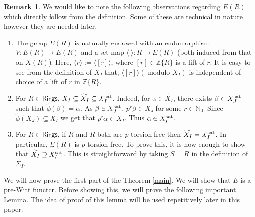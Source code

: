 \documentclass[11pt]{amsart}
\theoremstyle{plain}
\theoremstyle{definition}
\newtheorem{remark}[thm]{Remark}
\renewcommand{\tilde}{\widetilde}
\newcommand{\sat}{{\rm sat}}
\newcommand{\N}{{\mathbb N}}
\newcommand{\Z}{{\mathbb Z}}
\newcommand{\ab}[1]{\langle {#1} \rangle}
\newcommand{\Rings}{{\mathsf{Rings}}}
\begin{document}
\begin{remark}\label{rmk:e} We would like to note the following observations regarding $E(R)$ which directly follow from the definition. Some of these are technical in nature however they are needed later. 
\begin{enumerate}
\item The group $E(R)$ is naturally endowed with an endomorphism $V: E(R) \to E(R)$ and a set map $\ab{ \ }: R \to E(R)$ (both induced from that on $X(R)$). Here, $\ab{r} := \ab{[r]}$, where $[r] \in \Z\{R\}$ is a lift of $r$. It is easy to see from the definition of $X_I$ that, $\ab{[r]} (\text{ modulo } X_I)$  is independent of choice of a lift of $r$ in $\Z\{R\}$. 
\item For $R \in \Rings$, $X_I \subseteq \tilde{X_I} \subseteq X_I^{\sat}$. Indeed, for $\alpha \in \tilde{X_I}$, there exists $\beta \in X_J^{\sat}$ such that $\tilde{\phi}(\beta) = \alpha$. As $\beta \in X_J^{\sat}$, $p^r\beta \in X_J$ for some $r \in \N_0$. Since $\tilde{\phi}(X_J) \subseteq X_I$ we get that $p^r\alpha \in X_I$. Thus $\alpha \in X_I^{\sat}$.
\item For $R \in \Rings$, if $R$ and $\bar{R}$ both are $p$-torsion free then $\tilde{X_I} = X_I^{\sat}$. In particular, $E(R)$ is $p$-torsion free. To prove this, it is now enough to show that $\tilde{X_I} \supseteq X_I^{\sat}$. This is straightforward by taking $S = R$ in the definition of $\Sigma_I$.
\end{enumerate}
\end{remark}
\noindent We will now prove the first part of the Theorem \ref{main}. We will show that $E$ is a pre-Witt functor. Before showing this, we will prove the following important Lemma. The idea of proof of this lemma will be used repetitively later in this paper.\\
\end{document}
